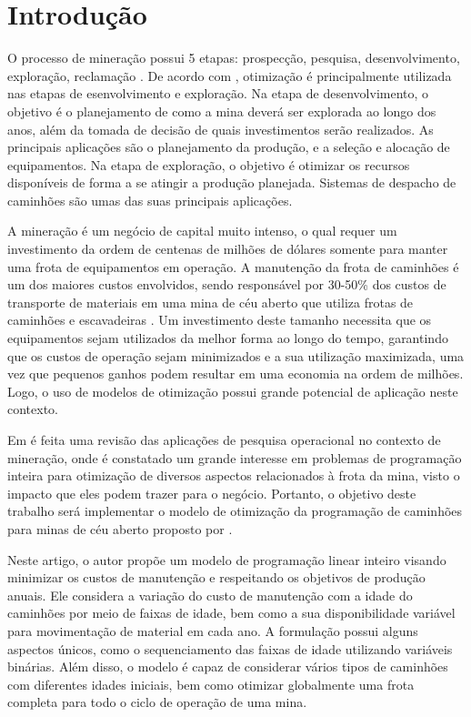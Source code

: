 \documentclass[conference]{IEEEtran}
\begin{document}
\section{Introdução}

O processo de mineração possui 5 etapas: prospecção, pesquisa, desenvolvimento,
exploração, reclamação \cite{GIFSThe599:online}. De acordo com \cite{newman2010}, otimização é principalmente utilizada nas etapas de esenvolvimento e exploração. Na etapa de desenvolvimento, o objetivo é o planejamento de como a mina deverá ser explorada ao longo dos anos, além da tomada de decisão de quais investimentos serão realizados. As principais aplicações são o planejamento da produção, e a seleção e alocação de equipamentos. Na etapa de exploração, o objetivo é otimizar os recursos disponíveis de forma a se atingir a produção planejada. Sistemas de despacho de caminhões são umas das suas principais
aplicações.

A mineração é um negócio de capital muito intenso, o qual requer um investimento da ordem de centenas de milhões de dólares somente para manter uma frota de equipamentos em operação. A manutenção da frota de caminhões é um dos maiores custos envolvidos, sendo responsável por 30-50\% dos custos de transporte de materiais em uma mina de céu aberto que utiliza frotas de caminhões e escavadeiras \cite{topal2010a}. Um investimento deste tamanho necessita que os equipamentos sejam utilizados da melhor forma ao longo do tempo, garantindo que os custos de operação sejam minimizados e a sua utilização maximizada, uma vez que pequenos ganhos podem resultar em uma economia na ordem de milhões. Logo, o uso de modelos de otimização possui grande potencial de aplicação neste contexto.

Em \cite{newman2010} é feita uma revisão das aplicações de pesquisa operacional no contexto de mineração, onde é constatado um grande interesse em problemas de programação inteira para otimização de diversos aspectos relacionados à frota da mina, visto o impacto que eles podem trazer para o negócio. Portanto, o objetivo deste trabalho será implementar o modelo de otimização da programação de caminhões para minas de céu aberto proposto por \cite{topal2010a}. 

Neste artigo, o autor propõe um modelo de programação linear inteiro visando minimizar os custos de manutenção e respeitando os objetivos de produção anuais. Ele considera a variação do custo de manutenção com a idade do caminhões por meio de faixas de idade, bem como a sua disponibilidade variável para movimentação de material em cada ano. A formulação possui alguns aspectos únicos, como o sequenciamento das faixas de idade utilizando variáveis binárias. Além disso, o modelo é capaz de considerar vários tipos de caminhões com diferentes idades iniciais, bem como otimizar globalmente uma frota completa para todo o ciclo de operação de uma mina.
\end{document}
